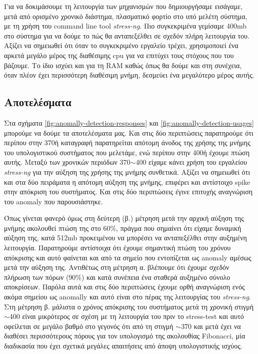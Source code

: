 Για να δοκιμάσουμε τη λειτουργία των μηχανισμών που δημιουργήσαμε εισάγαμε, μετά από ορισμένο χρονικό διάστημα, πλασματικό φορτίο στο υπό μελέτη σύστημα, με τη χρήση του command line tool \textit{stress-ng}. Πιο συγκεκριμένα γεμίσαμε 400mb στο σύστημα για να δούμε το πώς θα ανταπεξέλθει σε σχεδόν πλήρη λειτουργία του. Αξίζει να σημειωθεί ότι όταν το συγκεκριμένο εργαλείο τρέχει, χρησιμοποιεί ένα αρκετά μεγάλο μέρος της διαθέσιμης cpu για να επιτύχει τους στόχους που του βάζουμε. Το ίδιο ισχύει και για τη RAM καθώς όπως θα δούμε και στη συνέχεια, όταν πλέον έχει περισσότερη διαθέσιμη μνήμη, δεσμεύει ένα μεγαλύτερο μέρος αυτής.

\subsection{Αποτελέσματα}
\label{subsection:anomally-detection-results}

Στα σχήματα \autoref{fig:anomally-detection-responses} και \autoref{fig:anomally-detection-usages} μπορούμε να δούμε τα αποτελέσματα μας. Και στις δύο περιπτώσεις παρατηρούμε ότι περίπου στην 370ή καταγραφή παρατηρείται απότομη άνοδος της χρήσης της μνήμης του υπολογιστικού συστήματος που μελετάμε, ενώ περίπου στην 400ή έχουμε πτώση αυτής. Μεταξύ των χρονικών περιόδων 370$\sim$400 είχαμε κάνει χρήση του εργαλείου \textit{stress-ng} για την αύξηση της χρήσης της μνήμης συνθετικά. Αξίζει να σημειωθεί ότι και στα δύο πειράματα η απότομη αύξηση της μνήμης, επιφέρει και αντίστοιχο spike στην απόκριση του συστήματος. Και στις δύο περιπτώσεις έγινε επιτυχής αναγνώριση του anomaly που παρουσιάστηκε.

Όπως γίνεται φανερό όμως στη δεύτερη (β.) μέτρηση μετά την αρχική αύξηση της μνήμης ακολουθεί πτώση της στο 60\%, πράγμα που σημαίνει ότι είχαμε δυναμική αύξηση της, κατά 512mb προκειμένου να μπορέσει να ανταπεξέλθει στην αυξημένη λειτουργία. Παρατηρούμε αντίστοιχα ότι έχουμε σημαντική πτώση του χρόνου απόκρισης και αυτό φαίνεται και από τα σημείο που εντοπίζεται ως anomaly αμέσως μετά την αύξηση της. Αντιθέτως στη μέτρηση α. βλέπουμε ότι έχουμε σχεδόν πλήρωση των πόρων (90\%) και κατά συνέπεια ένα σταθερά αυξημένο σύνολο αποκρίσεων. Παρόλα αυτά και στις δύο περιπτώσεις έχουμε ορθή αναγνώριση ενός ακόμα σημείου ως anomally και αυτό είναι στο πέρας της λειτουργίας του \textit{stress-ng}. Στη μέτρηση β. μάλιστα ο χρόνος απόκρισης του συστήματος μετά τη χρονική στιγμή $\sim$400 είναι μικρότερος σε σχέση με τη λειτουργία του πριν το stress-test και αυτό οφείλεται σε μεγάλο βαθμό στο γεγονός ότι από τη στιγμή $\sim$370 και μετά έχει να διαθέσει περισσότερους πόρους για τον υπολογισμό της ακολουθίας Fibonacci, μία διαδικασία που έχει σχετικά μεγάλες απαιτήσεις από άποψη υπολογιστικής ισχύος.

